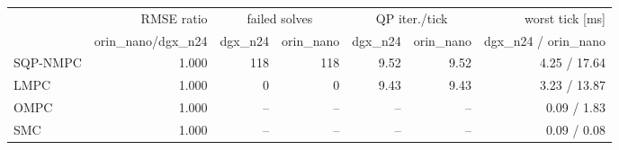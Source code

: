 \begin{tabular}{lrrrrrr}
\toprule
 & RMSE ratio & \multicolumn{2}{c}{failed solves} & \multicolumn{2}{c}{QP iter./tick} & worst tick [ms] \\
\cmidrule(lr){3-4}\cmidrule(lr){5-6}
 & orin\_nano/dgx\_n24 & dgx\_n24 & orin\_nano & dgx\_n24 & orin\_nano & dgx\_n24 / orin\_nano \\
\midrule
SQP-NMPC & 1.000 & 118 & 118 & 9.52 & 9.52 & 4.25 / 17.64 \\
LMPC & 1.000 & 0 & 0 & 9.43 & 9.43 & 3.23 / 13.87 \\
OMPC & 1.000 & -- & -- & -- & -- & 0.09 / 1.83 \\
SMC & 1.000 & -- & -- & -- & -- & 0.09 / 0.08 \\
\bottomrule
\end{tabular}
